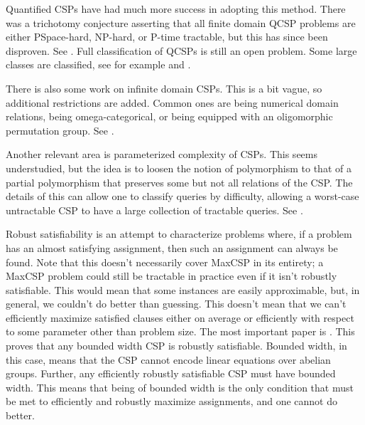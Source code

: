 Quantified CSPs have had much more success in adopting this method. There was a trichotomy conjecture asserting that all finite domain QCSP problems are either PSpace-hard, NP-hard, or P-time tractable, but this has since been disproven. See \citep{zhuk2022qcsp}. Full classification of QCSPs is still an open problem. Some large classes are classified, see for example \citep{zhuk2021complexity} and \citep{borner2009complexity}.

There is also some work on infinite domain CSPs. This is a bit vague, so additional restrictions are added. Common ones are being numerical domain relations, being omega-categorical, or being equipped with an oligomorphic permutation group. See \citep{bodirsky2012complexity}.

Another relevant area is parameterized complexity of CSPs. This seems understudied, but the idea is to loosen the notion of polymorphism to that of a partial polymorphism that preserves some but not all relations of the CSP. The details of this can allow one to classify queries by difficulty, allowing a worst-case untractable CSP to have a large collection of tractable queries. See \citep{couceiro2019fine}.

Robust satisfiability is an attempt to characterize problems where, if a problem has an almost satisfying assignment, then such an assignment can always be found. Note that this doesn’t necessarily cover MaxCSP in its entirety; a MaxCSP problem could still be tractable in practice even if it isn’t robustly satisfiable. This would mean that some instances are easily approximable, but, in general, we couldn’t do better than guessing. This doesn’t mean that we can’t efficiently maximize satisfied clauses either on average or efficiently with respect to some parameter other than problem size. The most important paper is \citep{barto2016robustly}. This proves that any bounded width CSP is robustly satisfiable. Bounded width, in this case, means that the CSP cannot encode linear equations over abelian groups. Further, any efficiently robustly satisfiable CSP must have bounded width. This means that being of bounded width is the only condition that must be met to efficiently and robustly maximize assignments, and one cannot do better.


